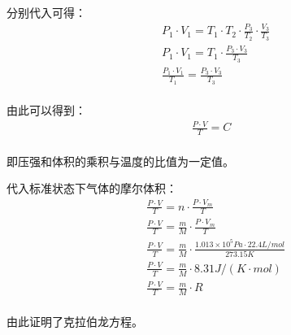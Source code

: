 \documentclass[UTF8]{ctexart}
\begin{document}
    分别代入可得：
    \begin{align}
        &P_1\cdot V_1=T_1\cdot T_2\cdot\frac{P_3}{T_2}\cdot\frac{V_3}{T_3}\\[5mm]
        &P_1\cdot V_1=T_1\cdot\frac{P_3\cdot V_3}{T_3}\\[5mm]
        &\frac{P_1\cdot V_1}{T_1}=\frac{P_3\cdot V_3}{T_3}
    \end{align}\\
    由此可以得到：
    \begin{align}
        \frac{P\cdot V}{T}=C
    \end{align}\\
    即压强和体积的乘积与温度的比值为一定值。
    
\newpage

    代入标准状态下气体的摩尔体积：\vspace{5pt}
    \begin{align}
        &\frac{P\cdot V}{T}=n\cdot\frac{P\cdot V_m}{T}\\[5mm]
        &\frac{P\cdot V}{T}=\frac{m}{M}\cdot\frac{P\cdot V_m}{T}\\[5mm]
        &\frac{P\cdot V}{T}=\frac{m}{M}\cdot\frac{1.013\times 10^5\si{Pa}\cdot 22.4\si{L/mol}}{273.15\si{K}}\\[5mm]
        &\frac{P\cdot V}{T}=\frac{m}{M}\cdot8.31\si{J/(K\cdot mol)}\\[5mm]
        &\frac{P\cdot V}{T}=\frac{m}{M}\cdot R
    \end{align}\\
    由此证明了克拉伯龙方程。

\newpage
\end{document}
